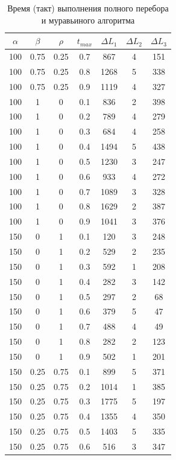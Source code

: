 \documentclass[a4paper,oneside,14pt]{extreport}
\begin{document}
\begin{table}[h]
\caption{Время (такт) выполнения полного перебора и муравьиного алгоритма}
\label{tbl:only}
\begin{center}
	\begin{tabular}{|c|c|c|c|c|c|c|}
		\hline
		$\alpha$ &  $\beta$& $\rho$ &  $t_{max}$ & $\Delta L_{1}$ & $\Delta L_{2}$ & $\Delta L_{3}$\\
		\hline
		100 & 0.75 & 0.25 & 0.7 & 867 & 4 & 151 \\
		100 & 0.75 & 0.25 & 0.8 & 1268 & 5 & 338 \\
		100 & 0.75 & 0.25 & 0.9 & 1119 & 4 & 327 \\
		100 & 1 & 0 & 0.1 & 836 & 2 & 398 \\
		100 & 1 & 0 & 0.2 & 789 & 4 & 279 \\
		100 & 1 & 0 & 0.3 & 684 & 4 & 258 \\
		100 & 1 & 0 & 0.4 & 1494 & 5 & 438 \\
		100 & 1 & 0 & 0.5 & 1230 & 3 & 247 \\
		100 & 1 & 0 & 0.6 & 933 & 4 & 272 \\
		100 & 1 & 0 & 0.7 & 1089 & 3 & 328 \\
		100 & 1 & 0 & 0.8 & 1629 & 2 & 387 \\
		100 & 1 & 0 & 0.9 & 1041 & 3 & 376 \\
		150 & 0 & 1 & 0.1 & 120 & 3 & 248 \\
		150 & 0 & 1 & 0.2 & 529 & 2 & 235 \\
		150 & 0 & 1 & 0.3 & 592 & 1 & 208 \\
		150 & 0 & 1 & 0.4 & 282 & 3 & 142 \\
		150 & 0 & 1 & 0.5 & 297 & 2 & 68 \\
		150 & 0 & 1 & 0.6 & 379 & 5 & 47 \\
		150 & 0 & 1 & 0.7 & 488 & 4 & 49 \\
		150 & 0 & 1 & 0.8 & 282 & 2 & 123 \\
		150 & 0 & 1 & 0.9 & 502 & 1 & 201 \\
		150 & 0.25 & 0.75 & 0.1 & 899 & 5 & 371 \\
		150 & 0.25 & 0.75 & 0.2 & 1014 & 1 & 385 \\
		150 & 0.25 & 0.75 & 0.3 & 1775 & 5 & 197 \\
		150 & 0.25 & 0.75 & 0.4 & 1355 & 4 & 350 \\
		150 & 0.25 & 0.75 & 0.5 & 1403 & 5 & 335 \\
		150 & 0.25 & 0.75 & 0.6 & 516 & 3 & 347 \\

\end{tabular}
\end{center}
\end{table}
\end{document}
